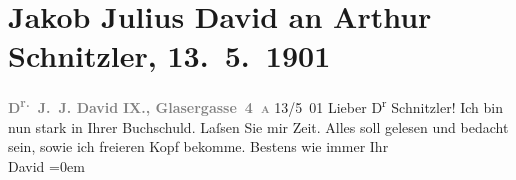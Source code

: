 

         \renewcommand{\erwaehnteOrte}{Orte: Glasergasse, Wien}
         \renewcommand{\erwaehnteWerke}{}
               \section[Jakob Julius David an Arthur Schnitzler, 13. 5. 1901]{ Jakob Julius David an Arthur Schnitzler, 13. 5. 1901}\nopagebreak{}\rehead{ }\begin{ledgroupsized}[t]{13cm}\normalsize\beginnumbering \toendnotes[C]{\smallbreak\pagebreak[2]} 
\pstart
           \noindent{}\centering{}{\pb}\textcolor{gray}{\textbf{D\textsuperscript{r.} J. J. David}}\pend
           \pstart
           \noindent{}\raggedleft{}\textcolor{gray}{\textbf{IX., Glasergasse 4 \textsc{a}}}\pend
           \pstart
           \raggedleft{}{\pb}13/5 01\pend
           \pstart\center{}Lieber D\textsuperscript{r} Schnitzler!\pend\pstart
           Ich bin nun stark in Ihrer Buchschuld. Laſsen Sie mir Zeit. Alles soll gelesen
                    und bedacht sein, sowie ich freieren Kopf bekomme.\pend
           \pstart
           Bestens wie immer Ihr{\\[\baselineskip]}\spacefill\mbox{David}\pend
           \leftskip=0em{}
         
         \endnumbering{}\end{ledgroupsized}  \newcommand{\dateiname}{L01119}\newcommand{\titel}{Jakob Julius David an Arthur Schnitzler, 13. 5. 1901}\newcommand{\editorInnen}{Martin Anton Müller und Gerd-Hermann Susen}
      